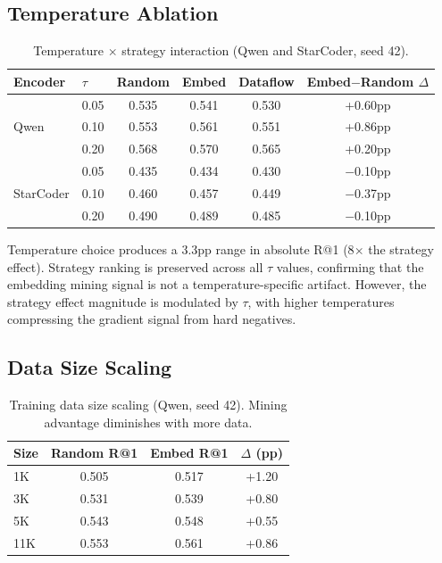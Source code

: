 \documentclass[11pt]{article}
\begin{document}
\subsection{Temperature Ablation}

\begin{table}[h]
\centering
\caption{Temperature $\times$ strategy interaction (Qwen and StarCoder, seed 42).}
\label{tab:temperature}
\begin{tabular}{llcccc}
\toprule
Encoder & $\tau$ & Random & Embed & Dataflow & Embed$-$Random $\Delta$ \\
\midrule
\multirow{3}{*}{Qwen} & 0.05 & 0.535 & 0.541 & 0.530 & +0.60pp \\
& 0.10 & 0.553 & 0.561 & 0.551 & +0.86pp \\
& 0.20 & 0.568 & 0.570 & 0.565 & +0.20pp \\
\midrule
\multirow{3}{*}{StarCoder} & 0.05 & 0.435 & 0.434 & 0.430 & $-$0.10pp \\
& 0.10 & 0.460 & 0.457 & 0.449 & $-$0.37pp \\
& 0.20 & 0.490 & 0.489 & 0.485 & $-$0.10pp \\
\bottomrule
\end{tabular}
\end{table}

Temperature choice produces a 3.3pp range in absolute R@1 (8$\times$ the strategy effect). Strategy ranking is preserved across all $\tau$ values, confirming that the embedding mining signal is not a temperature-specific artifact. However, the strategy effect magnitude is modulated by $\tau$, with higher temperatures compressing the gradient signal from hard negatives.

\subsection{Data Size Scaling}

\begin{table}[h]
\centering
\caption{Training data size scaling (Qwen, seed 42). Mining advantage diminishes with more data.}
\label{tab:data_scaling}
\begin{tabular}{lccc}
\toprule
Size & Random R@1 & Embed R@1 & $\Delta$ (pp) \\
\midrule
1K & 0.505 & 0.517 & +1.20 \\
3K & 0.531 & 0.539 & +0.80 \\
5K & 0.543 & 0.548 & +0.55 \\
11K & 0.553 & 0.561 & +0.86 \\
\bottomrule
\end{tabular}
\end{table}
\end{document}

